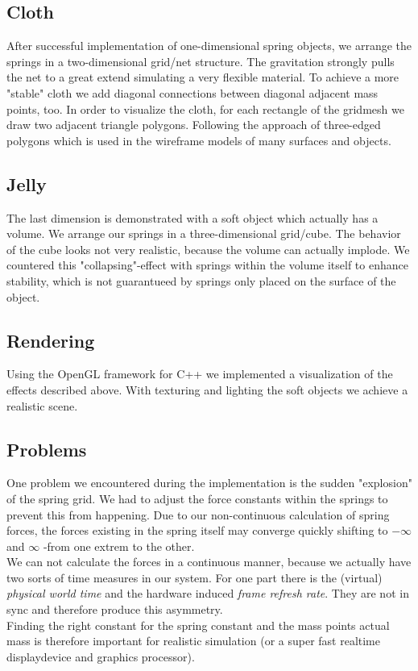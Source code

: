\documentclass[11pt]{article}
\begin{document}
\subsection{Cloth}
After successful implementation of one-dimensional spring objects, we arrange the springs in a two-dimensional grid/net structure. The gravitation strongly pulls the net to a great extend simulating a very flexible material. To achieve a more "stable" cloth we add diagonal connections between diagonal adjacent mass points, too. In order to visualize the cloth, for each rectangle of the gridmesh we draw two adjacent triangle polygons. Following the approach of three-edged polygons which is used in the wireframe models of many surfaces and objects.
\subsection{Jelly}
The last dimension is demonstrated with a soft object which actually has a volume. We arrange our springs in a three-dimensional grid/cube. The behavior of the cube looks not very realistic, because the volume can actually implode. We countered this "collapsing"-effect with springs within the volume itself to enhance stability, which is not guarantueed by springs only placed on the surface of the object.
\subsection{Rendering}
Using the OpenGL framework for C++ we implemented a visualization of the effects described above. With texturing and lighting the soft objects we achieve a realistic scene.
\subsection{Problems}
One problem we encountered during the implementation is the sudden "explosion" of the spring grid. We had to adjust the force constants within the springs to prevent this from happening. Due to our non-continuous calculation of spring forces, the forces existing in the spring itself may converge quickly shifting to $-\infty$ and $\infty$ -from one extrem to the other.\\[1em]
We can not calculate the forces in a continuous manner, because we actually have two sorts of time measures in our system. For one part there is the (virtual) \textit{physical world time} and the hardware induced \textit{frame refresh rate}. They are not in sync and therefore produce this asymmetry.\\[1em]
Finding the right constant for the spring constant and the mass points actual mass is therefore important for realistic simulation (or a super fast realtime displaydevice and graphics processor).
%
\end{document}
